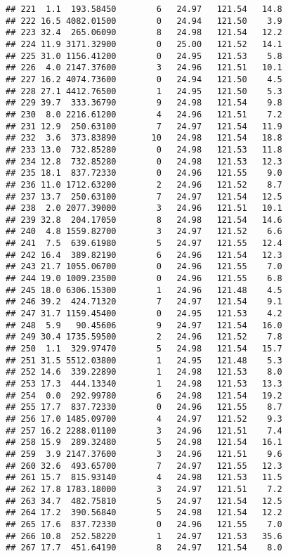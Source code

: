 \documentclass[
]{article}
\begin{document}
\begin{verbatim}
## 221  1.1  193.58450        6   24.97   121.54   14.8
## 222 16.5 4082.01500        0   24.94   121.50    3.9
## 223 32.4  265.06090        8   24.98   121.54   12.2
## 224 11.9 3171.32900        0   25.00   121.52   14.1
## 225 31.0 1156.41200        0   24.95   121.53    5.8
## 226  4.0 2147.37600        3   24.96   121.51   10.1
## 227 16.2 4074.73600        0   24.94   121.50    4.5
## 228 27.1 4412.76500        1   24.95   121.50    5.3
## 229 39.7  333.36790        9   24.98   121.54    9.8
## 230  8.0 2216.61200        4   24.96   121.51    7.2
## 231 12.9  250.63100        7   24.97   121.54   11.9
## 232  3.6  373.83890       10   24.98   121.54   18.8
## 233 13.0  732.85280        0   24.98   121.53   11.8
## 234 12.8  732.85280        0   24.98   121.53   12.3
## 235 18.1  837.72330        0   24.96   121.55    9.0
## 236 11.0 1712.63200        2   24.96   121.52    8.7
## 237 13.7  250.63100        7   24.97   121.54   12.5
## 238  2.0 2077.39000        3   24.96   121.51   10.1
## 239 32.8  204.17050        8   24.98   121.54   14.6
## 240  4.8 1559.82700        3   24.97   121.52    6.6
## 241  7.5  639.61980        5   24.97   121.55   12.4
## 242 16.4  389.82190        6   24.96   121.54   12.3
## 243 21.7 1055.06700        0   24.96   121.55    7.0
## 244 19.0 1009.23500        0   24.96   121.55    6.8
## 245 18.0 6306.15300        1   24.96   121.48    4.5
## 246 39.2  424.71320        7   24.97   121.54    9.1
## 247 31.7 1159.45400        0   24.95   121.53    4.2
## 248  5.9   90.45606        9   24.97   121.54   16.0
## 249 30.4 1735.59500        2   24.96   121.52    7.8
## 250  1.1  329.97470        5   24.98   121.54   15.7
## 251 31.5 5512.03800        1   24.95   121.48    5.3
## 252 14.6  339.22890        1   24.98   121.53    8.0
## 253 17.3  444.13340        1   24.98   121.53   13.3
## 254  0.0  292.99780        6   24.98   121.54   19.2
## 255 17.7  837.72330        0   24.96   121.55    8.7
## 256 17.0 1485.09700        4   24.97   121.52    9.3
## 257 16.2 2288.01100        3   24.96   121.51    7.4
## 258 15.9  289.32480        5   24.98   121.54   16.1
## 259  3.9 2147.37600        3   24.96   121.51    9.6
## 260 32.6  493.65700        7   24.97   121.55   12.3
## 261 15.7  815.93140        4   24.98   121.53   11.5
## 262 17.8 1783.18000        3   24.97   121.51    7.2
## 263 34.7  482.75810        5   24.97   121.54   12.5
## 264 17.2  390.56840        5   24.98   121.54   12.2
## 265 17.6  837.72330        0   24.96   121.55    7.0
## 266 10.8  252.58220        1   24.97   121.53   35.6
## 267 17.7  451.64190        8   24.97   121.54    8.0

\end{verbatim}
\end{document}
